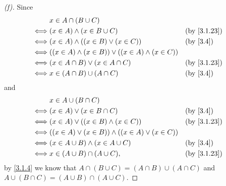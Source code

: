 \begin{proof}[(f)]
  Since
  \begin{align*}
         & x \in A \cap (B \cup C)                                                       \\
    \iff & (x \in A) \land (x \in B \cup C)                             &  & \by{3.1.23} \\
    \iff & (x \in A) \land ((x \in B) \lor (x \in C))                   &  & \by{3.4}    \\
    \iff & ((x \in A) \land (x \in B)) \lor ((x \in A) \land (x \in C))                  \\
    \iff & (x \in A \cap B) \lor (x \in A \cap C)                       &  & \by{3.1.23} \\
    \iff & x \in (A \cap B) \cup (A \cap C)                             &  & \by{3.4}
  \end{align*}
  and
  \begin{align*}
         & x \in A \cup (B \cap C)                                                      \\
    \iff & (x \in A) \lor (x \in B \cap C)                             &  & \by{3.4}    \\
    \iff & (x \in A) \lor ((x \in B) \land (x \in C))                  &  & \by{3.1.23} \\
    \iff & ((x \in A) \lor (x \in B)) \land ((x \in A) \lor (x \in C))                  \\
    \iff & (x \in A \cup B) \land (x \in A \cup C)                     &  & \by{3.4}    \\
    \iff & x \in (A \cup B) \cap (A \cup C),                           &  & \by{3.1.23}
  \end{align*}
  by \cref{3.1.4} we know that \(A \cap (B \cup C) = (A \cap B) \cup (A \cap C)\) and \(A \cup (B \cap C) = (A \cup B) \cap (A \cup C)\).
\end{proof}

